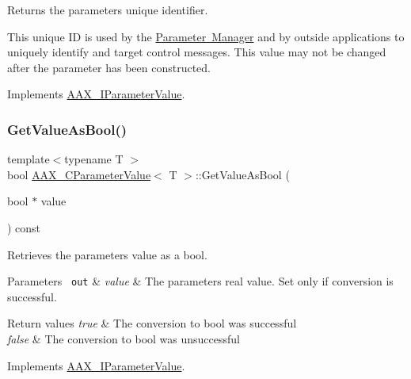 Returns the parameter\textquotesingle{}s unique identifier. 

This unique ID is used by the \mbox{\hyperlink{a00814}{Parameter Manager}} and by outside applications to uniquely identify and target control messages. This value may not be changed after the parameter has been constructed. 

Implements \mbox{\hyperlink{a01853_a5de1e79f1f0e7024f6f473d923b5dda2}{A\+A\+X\+\_\+\+I\+Parameter\+Value}}.

\mbox{\label{a01533_a7b299559a4cc6de5ef4a77dae32c99e3}} 
\subsubsection{\texorpdfstring{GetValueAsBool()}{GetValueAsBool()}\hspace{0.1cm}{\footnotesize\ttfamily [1/2]}}
{\footnotesize\ttfamily template$<$typename T $>$ \\
bool \mbox{\hyperlink{a01533}{A\+A\+X\+\_\+\+C\+Parameter\+Value}}$<$ T $>$\+::Get\+Value\+As\+Bool (\begin{DoxyParamCaption}\item[{bool $\ast$}]{value }\end{DoxyParamCaption}) const\hspace{0.3cm}{\ttfamily [virtual]}}



Retrieves the parameter\textquotesingle{}s value as a bool. 


\begin{DoxyParams}[1]{Parameters}
\mbox{\texttt{ out}}  & {\em value} & The parameter\textquotesingle{}s real value. Set only if conversion is successful.\\
\hline
\end{DoxyParams}

\begin{DoxyRetVals}{Return values}
{\em true} & The conversion to bool was successful \\
\hline
{\em false} & The conversion to bool was unsuccessful \\
\hline
\end{DoxyRetVals}


Implements \mbox{\hyperlink{a01853_a5d792ea5770ace586d5de9e32f35773d}{A\+A\+X\+\_\+\+I\+Parameter\+Value}}.

